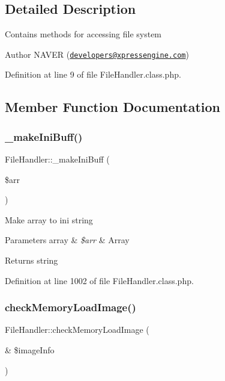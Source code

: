 \subsection{Detailed Description}
Contains methods for accessing file system

\begin{DoxyAuthor}{Author}
N\+A\+V\+ER (\href{mailto:developers@xpressengine.com}{\tt developers@xpressengine.\+com}) 
\end{DoxyAuthor}


Definition at line 9 of file File\+Handler.\+class.\+php.



\subsection{Member Function Documentation}
\hypertarget{classFileHandler_a8975f9247987757497e0288f3ee09173}{}\label{classFileHandler_a8975f9247987757497e0288f3ee09173} 
\subsubsection{\texorpdfstring{\+\_\+make\+Ini\+Buff()}{\_makeIniBuff()}}
{\footnotesize\ttfamily File\+Handler\+::\+\_\+make\+Ini\+Buff (\begin{DoxyParamCaption}\item[{}]{\$arr }\end{DoxyParamCaption})}

Make array to ini string


\begin{DoxyParams}[1]{Parameters}
array & {\em \$arr} & Array \\
\hline
\end{DoxyParams}
\begin{DoxyReturn}{Returns}
string 
\end{DoxyReturn}


Definition at line 1002 of file File\+Handler.\+class.\+php.

\hypertarget{classFileHandler_a0b240e89b6ce57cb94e855fc25e5e9f3}{}\label{classFileHandler_a0b240e89b6ce57cb94e855fc25e5e9f3} 
\subsubsection{\texorpdfstring{check\+Memory\+Load\+Image()}{checkMemoryLoadImage()}}
{\footnotesize\ttfamily File\+Handler\+::check\+Memory\+Load\+Image (\begin{DoxyParamCaption}\item[{\&}]{\$image\+Info }\end{DoxyParamCaption})}

